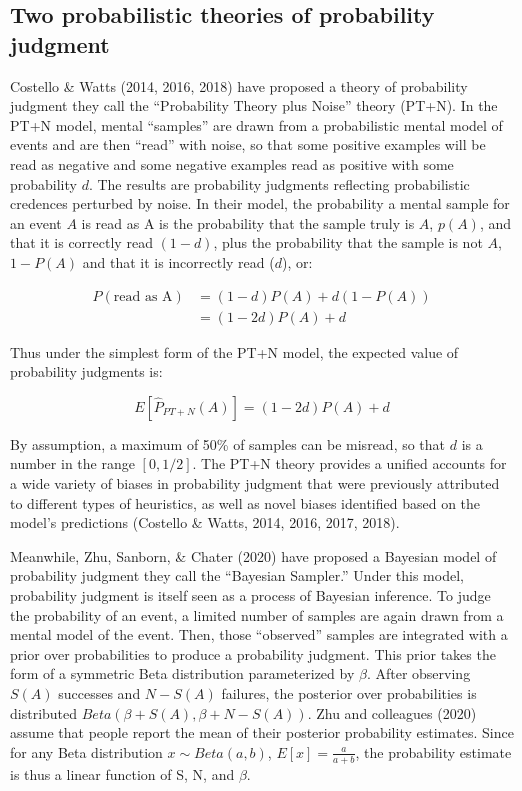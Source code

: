 \documentclass[
  english,
  man,floatsintext]{apa6}
\begin{document}
\hypertarget{two-probabilistic-theories-of-probability-judgment}{%
\subsection{Two probabilistic theories of probability judgment}\label{two-probabilistic-theories-of-probability-judgment}}

Costello \& Watts (2014, 2016, 2018) have proposed a theory of probability judgment they call the ``Probability Theory plus Noise'' theory (PT+N). In the PT+N model, mental ``samples'' are drawn from a probabilistic mental model of events and are then ``read'' with noise, so that some positive examples will be read as negative and some negative examples read as positive with some probability \(d\). The results are probability judgments reflecting probabilistic credences perturbed by noise. In their model, the probability a mental sample for an event \(A\) is read as A is the probability that the sample truly is \(A\), \(p(A)\), and that it is correctly read \((1-d)\), plus the probability that the sample is not \(A\), \(1-P(A)\) and that it is incorrectly read (\(d\)), or:

\begin{align*}
  P(\text{read as A}) &= (1-d)P(A) + d(1-P(A)) \\
  &= (1-2d)P(A) + d
\end{align*}

Thus under the simplest form of the PT+N model, the expected value of probability judgments is:

\[E[\hat{P}_{PT+N}(A)] = (1-2d)P(A) + d \]

By assumption, a maximum of 50\% of samples can be misread, so that \(d\) is a number in the range \([0, 1/2]\). The PT+N theory provides a unified accounts for a wide variety of biases in probability judgment that were previously attributed to different types of heuristics, as well as novel biases identified based on the model's predictions (Costello \& Watts, 2014, 2016, 2017, 2018).

Meanwhile, Zhu, Sanborn, \& Chater (2020) have proposed a Bayesian model of probability judgment they call the ``Bayesian Sampler.'' Under this model, probability judgment is itself seen as a process of Bayesian inference. To judge the probability of an event, a limited number of samples are again drawn from a mental model of the event. Then, those ``observed'' samples are integrated with a prior over probabilities to produce a probability judgment. This prior takes the form of a symmetric Beta distribution parameterized by \(\beta\). After observing \(S(A)\) successes and \(N - S(A)\) failures, the posterior over probabilities is distributed \(Beta(\beta + S(A), \beta + N - S(A))\). Zhu and colleagues (2020) assume that people report the mean of their posterior probability estimates. Since for any Beta distribution \(x \sim Beta(a,b)\), \(E[x] = \frac{a}{a+b}\), the probability estimate is thus a linear function of S, N, and \(\beta\).
\end{document}
